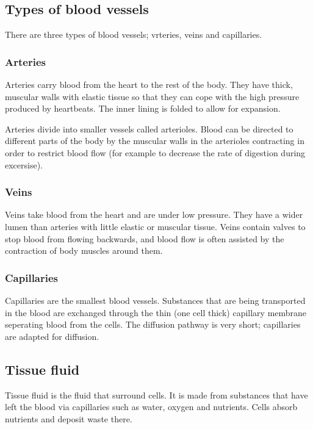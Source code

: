 \documentclass{article}
\begin{document}
\subsection*{Types of blood vessels}

There are three types of blood vessels; vrteries, veins and capillaries.

\subsubsection*{Arteries}

Arteries carry blood from the heart to the rest of the body. They have thick,
muscular walls with elastic tissue so that they can cope with the high pressure
produced by heartbeats. The inner lining is folded to allow for expansion.

Arteries divide into smaller vessels called arterioles. Blood can be directed to
different parts of the body by the muscular walls in the arterioles contracting
in order to restrict blood flow (for example to decrease the rate of digestion
during excersise).

\subsubsection*{Veins}

Veins take blood from the heart and are under low pressure. They have a wider
lumen than arteries with little elastic or muscular tissue. Veins contain valves
to stop blood from flowing backwards, and blood flow is often assisted by the
contraction of body muscles around them.

\subsubsection*{Capillaries}

Capillaries are the smallest blood vessels. Substances that are being
transported in the blood are exchanged through the thin (one cell thick)
capillary membrane seperating blood from the cells. The diffusion pathway is
very short; capillaries are adapted for diffusion.

\subsection*{Tissue fluid}

Tissue fluid is the fluid that surround cells. It is made from substances that
have left the blood via capillaries such as water, oxygen and nutrients. Cells
absorb nutrients and deposit waste there.
\end{document}
